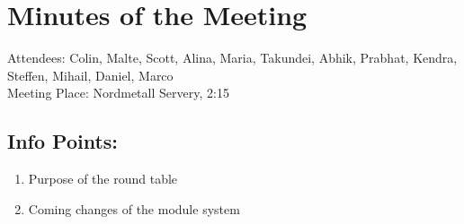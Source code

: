
\section{Minutes of the Meeting}
\label{sec-1}
\noindent Attendees: Colin, Malte, Scott, Alina, Maria, Takundei, Abhik, Prabhat, Kendra, Steffen, Mihail, Daniel, Marco\\
\noindent Meeting Place: Nordmetall Servery, 2:15
\subsection{Info Points:}
\label{sec-1-1}
\begin{enumerate}
\item Purpose of the round table
\item Coming changes of the module system
\end{enumerate}
